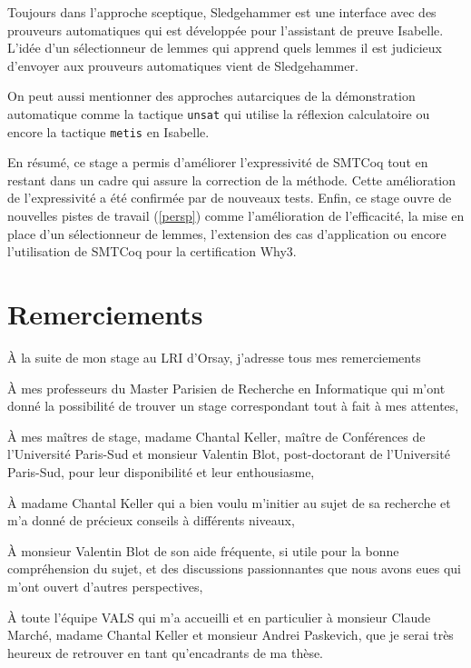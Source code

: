 \documentclass[11pt]{article}
\begin{document}
Toujours dans l'approche sceptique, Sledgehammer \cite{sledgehammer_manual} est une interface avec des prouveurs automa\-tiques qui est développée pour l'assistant de preuve Isabelle. L'idée d'un sélection\-neur de lemmes qui apprend quels lemmes il est judicieux d'envoyer aux prouveurs automa\-tiques \cite{hol_selector} vient de Sledgehammer.

On peut aussi mentionner des approches autarciques de la démonstration automatique comme la tactique \texttt{unsat} \cite{smt_autarcique} qui utilise la réflexion calculatoire ou encore la tactique \texttt{metis} en Isabelle. \medbreak

En résumé, ce stage a permis d'améliorer l'expressivité de SMTCoq tout en restant dans un cadre qui assure la correction de la méthode. Cette amélioration de l'expressivité a été confirmée par de nouveaux tests. Enfin, ce stage ouvre de nouvelles pistes de travail (\ref{persp}) comme l'amélioration de l'efficacité, la mise en place d'un sélectionneur de lemmes, l'extension des cas d'application ou encore l'utilisation de SMTCoq pour la certification Why3.

\newpage
\pagestyle{empty}
\section*{Remerciements}

\bigbreak\bigbreak\bigbreak

À la suite de mon stage au LRI d'Orsay, j'adresse tous mes remerciements \bigbreak\bigbreak

À mes professeurs du Master Parisien de Recherche en Informatique qui m'ont donné la possibilité de trouver un stage correspondant tout à fait à mes attentes, \bigbreak\bigbreak

À mes maîtres de stage, madame Chantal Keller, maître de Conférences de l'Université Paris-Sud  et monsieur Valentin Blot, post-doctorant de l'Université Paris-Sud, pour leur disponibilité et leur enthousiasme,

À madame Chantal Keller qui a bien voulu m'initier au sujet de sa recherche et m'a donné de précieux conseils à différents niveaux,

À monsieur Valentin Blot de son aide fréquente, si utile pour la bonne compréhension du sujet, et des discussions passionnantes que nous avons eues qui m'ont ouvert d'autres perspectives, \bigbreak\bigbreak

À toute l'équipe VALS qui m'a accueilli et en particulier à monsieur Claude Marché, madame Chantal Keller et monsieur Andrei Paskevich, que je serai très heureux de retrouver en tant qu'encadrants de ma thèse.
\end{document}
